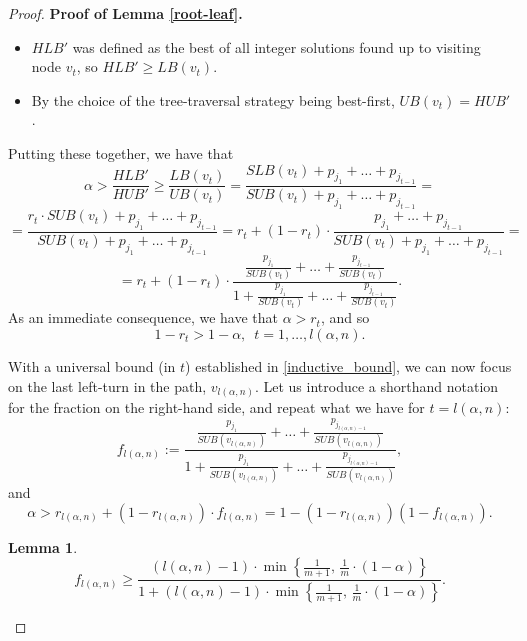 \documentclass[moor,sglanonrev]{informs4}
\theoremstyle{plain}
\newtheorem{lmm}{Lemma}  %
\begin{document}
\begin{proof}{\textbf{Proof of Lemma \ref{root-leaf}.}}
\begin{itemize}
        \item $HLB'$ was defined as the best of all integer solutions found up to visiting node $v_t$, so $HLB' \ge LB(v_t)$.
        
        \item By the choice of the tree-traversal strategy being best-first, $UB(v_t) = HUB'$.
    \end{itemize}
    
    Putting these together, we have that
    \[
    \alpha > \frac{HLB'}{HUB'} \ge \frac{LB(v_t)}{UB(v_t)} = \frac{SLB(v_t) + p_{j_1} + \ldots + p_{j_{t-1}}}{SUB(v_t) + p_{j_{1}} + \ldots +p_{j_{t-1}}} = 
    \]
    \[
    =\frac{r_t \cdot SUB(v_t) + p_{j_1} + \ldots + p_{j_{t-1}}}{SUB(v_t) + p_{j_1} + \ldots + p_{j_{t-1}}} = r_t + (1-r_t)\cdot \frac{p_{j_1} + \ldots + p_{j_{t-1}}}{SUB(v_t) + p_{j_1} + \ldots + p_{j_{t-1}}} =
    \]
    \[
    =  r_t + (1-r_t)\cdot \frac{\frac{p_{j_1}}{SUB(v_t)} + \ldots + \frac{p_{j_{t-1}}}{SUB(v_t)}}{1 + \frac{p_{j_1}}{SUB(v_t)} + \ldots + \frac{p_{j_{t-1}}}{SUB(v_t)}}.
    \]
    As an immediate consequence, we have that $\alpha > r_t$, and so
    \begin{equation}\label{inductive_bound}
        1-r_t > 1- \alpha, \,\,\, t = 1, \ldots, l(\alpha, n).
    \end{equation}

    With a universal bound (in $t$) established in \eqref{inductive_bound}, we can now focus on the last left-turn in the path, $v_{l(\alpha, n)}$. Let us introduce a shorthand notation for the fraction on the right-hand side, and repeat what we have for $t=l(\alpha, n)$:
    \[
    f_{l(\alpha, n)} := \frac{\frac{p_{j_1}}{SUB(v_{l(\alpha, n)})} + \ldots + \frac{p_{j_{l(\alpha, n)-1}}}{SUB(v_{l(\alpha, n)})}}
    {1 + \frac{p_{j_1}}{SUB(v_{l(\alpha, n)})} + \ldots + \frac{p_{j_{l(\alpha, n)-1}}}{SUB(v_{l(\alpha, n)})}},
    \]
    and
    \begin{equation}\label{alpha}
        \alpha > r_{l(\alpha, n)} + (1-r_{l(\alpha, n)}) \cdot f_{l(\alpha, n)} = 1 - (1-r_{l(\alpha, n)})(1-f_{l(\alpha,n)}).
    \end{equation}

    \begin{lmm}\label{f}
        \[
        f_{l(\alpha, n)} \ge \frac{(l(\alpha, n) -1)\cdot \min\left\{\frac{1}{m+1},\, \frac{1}{m} \cdot (1-\alpha)\right\}}{1+(l(\alpha, n) -1)\cdot \min\left\{\frac{1}{m+1},\, \frac{1}{m} \cdot (1-\alpha)\right\}}.
        \]
    \end{lmm}


\end{proof}
\end{document}
